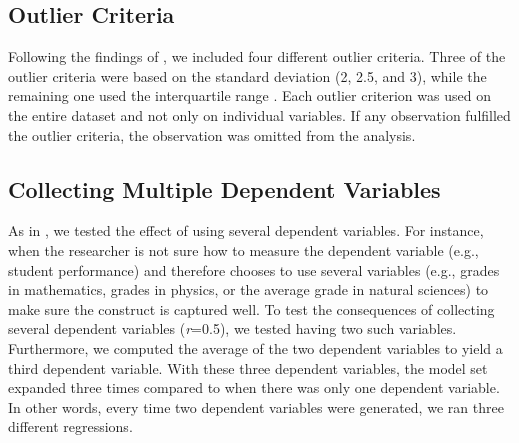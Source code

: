 \subsection{Outlier Criteria}
Following the findings of \cite{Leyes2013}, we included four different outlier criteria. Three of the outlier criteria were based on the standard deviation (2, 2.5, and 3), while the remaining one used the interquartile range \citep{Rousseeuw2011}. Each outlier criterion was used on the entire dataset and not only on individual variables. If any observation fulfilled the outlier criteria, the observation was omitted from the analysis.

\subsection{Collecting Multiple Dependent Variables}
As in \cite{Simmons2011}, we tested the effect of using several dependent variables. For instance, when the researcher is not sure how to measure the dependent variable (e.g., student performance) and therefore chooses to use several variables (e.g., grades in mathematics, grades in physics, or the average grade in natural sciences) to make sure the construct is captured well. To test the consequences of collecting several dependent variables (\textit{r}=0.5), we tested having two such variables. Furthermore, we computed the average of the two dependent variables to yield a third dependent variable. With these three dependent variables, the model set expanded three times compared to when there was only one dependent variable. In other words, every time two dependent variables were generated, we ran three different regressions. 


